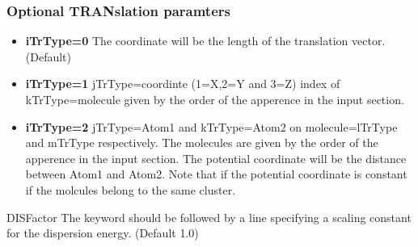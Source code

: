 \begin{keywordlist}
\subsubsection{Optional TRANslation paramters}
\begin{itemize}
\itemsep 9pt plus 3pt minus 3pt
\item
{\bf iTrType=0}
The coordinate will be the length of the translation vector. (Default)
\item
{\bf iTrType=1}
jTrType=coordinte (1=X,2=Y and 3=Z) index of kTrType=molecule given by the order of the apperence in the input section.
\item
{\bf iTrType=2}
jTrType=Atom1 and kTrType=Atom2 on molecule=lTrType and mTrType respectively. The molecules are given by the order of the apperence in the input section. The potential coordinate will be the distance between Atom1 and Atom2. Note that if the potential coordinate is constant if the molcules belong to the same cluster.

\end{itemize}
\item[DISFactor]
The keyword should be followed by a line specifying a scaling constant for the dispersion energy. (Default 1.0)
\end{keywordlist}
